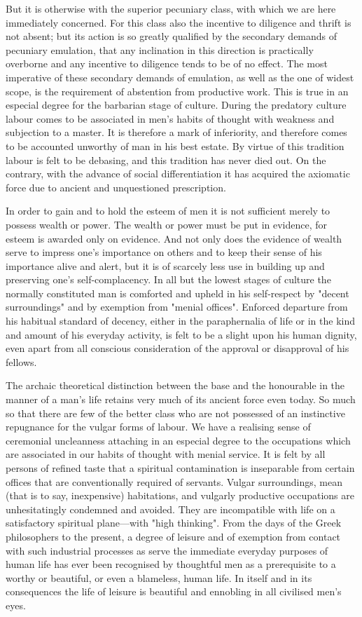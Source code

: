 \documentclass[12pt]{report}
\begin{document}
But it is otherwise with the superior pecuniary class, with which we
are here immediately concerned. For this class also the incentive
to diligence and thrift is not absent; but its action is so greatly
qualified by the secondary demands of pecuniary emulation, that any
inclination in this direction is practically overborne and any incentive
to diligence tends to be of no effect. The most imperative of these
secondary demands of emulation, as well as the one of widest scope, is
the requirement of abstention from productive work. This is true in an
especial degree for the barbarian stage of culture. During the predatory
culture labour comes to be associated in men's habits of thought
with weakness and subjection to a master. It is therefore a mark of
inferiority, and therefore comes to be accounted unworthy of man in his
best estate. By virtue of this tradition labour is felt to be debasing,
and this tradition has never died out. On the contrary, with the advance
of social differentiation it has acquired the axiomatic force due to
ancient and unquestioned prescription.

In order to gain and to hold the esteem of men it is not sufficient
merely to possess wealth or power. The wealth or power must be put in
evidence, for esteem is awarded only on evidence. And not only does the
evidence of wealth serve to impress one's importance on others and
to keep their sense of his importance alive and alert, but it is of
scarcely less use in building up and preserving one's self-complacency.
In all but the lowest stages of culture the normally constituted man is
comforted and upheld in his self-respect by "decent surroundings" and
by exemption from "menial offices". Enforced departure from his habitual
standard of decency, either in the paraphernalia of life or in the kind
and amount of his everyday activity, is felt to be a slight upon his
human dignity, even apart from all conscious consideration of the
approval or disapproval of his fellows.

The archaic theoretical distinction between the base and the honourable
in the manner of a man's life retains very much of its ancient force
even today. So much so that there are few of the better class who are not
possessed of an instinctive repugnance for the vulgar forms of labour.
We have a realising sense of ceremonial uncleanness attaching in an
especial degree to the occupations which are associated in our habits of
thought with menial service. It is felt by all persons of refined taste
that a spiritual contamination is inseparable from certain offices that
are conventionally required of servants. Vulgar surroundings, mean (that
is to say, inexpensive) habitations, and vulgarly productive occupations
are unhesitatingly condemned and avoided. They are incompatible with
life on a satisfactory spiritual plane---with "high thinking". From the
days of the Greek philosophers to the present, a degree of leisure and
of exemption from contact with such industrial processes as serve the
immediate everyday purposes of human life has ever been recognised by
thoughtful men as a prerequisite to a worthy or beautiful, or even a
blameless, human life. In itself and in its consequences the life of
leisure is beautiful and ennobling in all civilised men's eyes.
\end{document}
